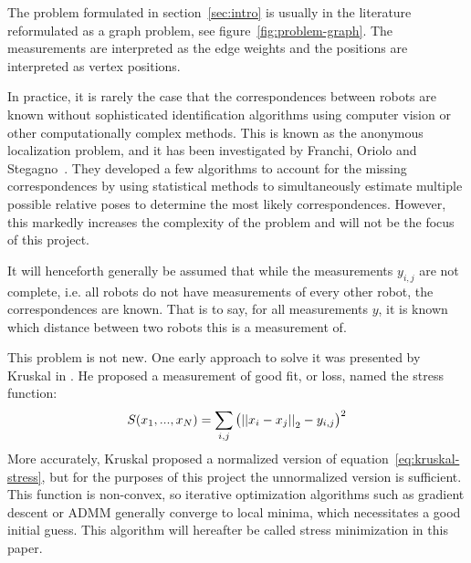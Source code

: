 The problem formulated in section~\ref{sec:intro} is usually in the literature reformulated as a graph problem, see figure~\ref{fig:problem-graph}. The measurements are interpreted as the edge weights and the positions are interpreted as vertex positions. 

In practice, it is rarely the case that the correspondences between robots are known without sophisticated identification algorithms using computer vision or other computationally complex methods. This is known as the anonymous localization problem, and it has been investigated by Franchi, Oriolo and Stegagno~\cite{anonymous_loc_1,anonymous_loc_2,anonymous_loc_3}. They developed a few algorithms to account for the missing correspondences by using statistical methods to simultaneously estimate multiple possible relative poses to determine the most likely correspondences. However, this markedly increases the complexity of the problem and will not be the focus of this project.

It will henceforth generally be assumed that while the measurements $y_{i,j}$ are not complete, i.e. all robots do not have measurements of every other robot, the correspondences are known. That is to say, for all measurements $y$, it is known which distance between two robots this is a measurement of. 

This problem is not new. One early approach to solve it was presented by Kruskal in \cite{Kruskal1964}. He proposed a measurement of good fit, or loss, named the stress function: 
\begin{align}
    \label{eq:kruskal-stress}
    S(x_1, ..., x_N) = \sum_{i,j} \left(
        \norm{x_i - x_j}_2 - y_{i, j}
    \right)^2
\end{align}
More accurately, Kruskal proposed a normalized version of equation~\ref{eq:kruskal-stress}, but for the purposes of this project the unnormalized version is sufficient. This function is non-convex, so iterative optimization algorithms such as gradient descent or ADMM generally converge to local minima, which necessitates a good initial guess. This algorithm will hereafter be called stress minimization in this paper.

